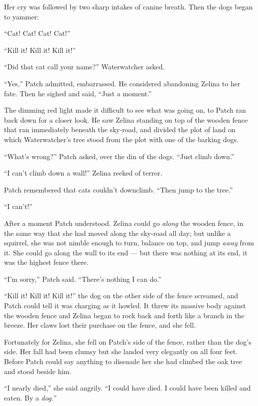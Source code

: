 \documentclass[ebook,oneside,openany,17pt]{memoir}
\newenvironment{tolerant}[1]{%
  \par\tolerance=#1\relax
}{%
  \par
}
\begin{document}
Her cry was followed by two sharp intakes of canine breath. Then the
dogs began to yammer:

“Cat! Cat! Cat! Cat!”

“Kill it! Kill it! Kill it!”

“Did that cat call your name?” Waterwatcher ask\-ed.

“Yes,” Patch admitted, embarrassed. He considered abandoning Zelina to
her fate. Then he sighed and said, “Just a moment.”

The dimming red light made it difficult to see what was going on, to
Patch ran back down for a closer look. He saw Zelina standing on top
of the wooden fence that ran immediately beneath the sky-road, and
divided the plot of land on which Waterwatcher’s tree stood from the
plot with one of the barking dogs.

“What’s wrong?” Patch asked, over the din of the dogs. “Just climb
down.”

“I can’t climb down a wall!” Zelina reeked of terror.

Patch remembered that cats couldn’t downclimb. “Then jump to the
tree.”

“I can’t!”

After a moment Patch understood. Zelina could go \emph{along} the
wooden fence, in the same way that she had moved along the sky-road
all day; but unlike a squirrel, she was not nimble enough to turn,
balance on top, and jump \emph{away} from it. She could go along the
wall to its end — but there was nothing at its end, it was the highest
fence there.

“I’m sorry,” Patch said. “There’s nothing I can do.”

\begin{tolerant}{2000}
“Kill it! Kill it! Kill it!” the dog on the other side of the fence
screamed, and Patch could tell it was charging as it howled. It threw
its massive body against the wooden fence and Zelina began to rock
back and forth like a branch in the breeze. Her claws lost their
purchase on the fence, and she fell.
\end{tolerant}

Fortunately for Zelina, she fell on Patch’s side of the fence, rather
than the dog’s side. Her fall had been clumsy but she landed very
elegantly on all four feet. Before Patch could say anything to
dissuade her she had climbed the oak tree and stood beside him.

“I nearly died,” she said angrily. “I could have died. I could have
been killed and eaten. By a \emph{dog.}”
\end{document}
